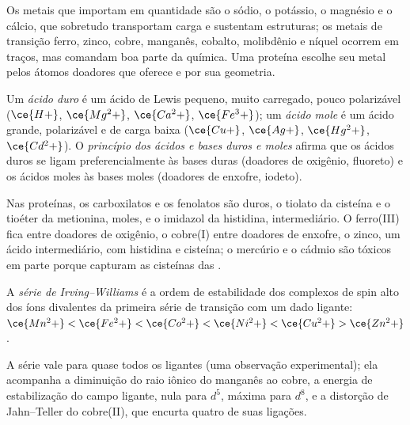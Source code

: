 Os metais que importam em quantidade são o sódio, o potássio, o magnésio e o
cálcio, que sobretudo transportam carga e sustentam estruturas; os metais de transição
ferro, zinco, cobre, manganês, cobalto, molibdênio e níquel ocorrem em traços,
mas comandam boa parte da química. Uma proteína escolhe seu metal pelos átomos
doadores que oferece e por sua geometria.

\begin{definition}\label{def:b3:bioinorganic:hsab}
Um \emph{ácido duro} é um ácido de Lewis pequeno, muito carregado, pouco
polarizável ($\ce{H+}$, $\ce{Mg^2+}$, $\ce{Ca^2+}$, $\ce{Fe^3+}$); um \emph{ácido
mole} é um ácido grande, polarizável e de carga baixa ($\ce{Cu+}$, $\ce{Ag+}$,
$\ce{Hg^2+}$, $\ce{Cd^2+}$). O \emph{princípio dos ácidos e bases duros e moles}
afirma que os ácidos duros se ligam preferencialmente às bases duras
(doadores de oxigênio, fluoreto) e os ácidos moles às bases moles (doadores de enxofre, iodeto).
\end{definition}

Nas proteínas, os carboxilatos e os fenolatos são duros, o tiolato da cisteína e
o tioéter da metionina, moles, e o imidazol da histidina, intermediário. O ferro(III)
fica entre doadores de oxigênio, o cobre(I) entre doadores de enxofre, o zinco, um ácido
intermediário, com histidina e cisteína; o mercúrio e o cádmio são tóxicos em parte
porque capturam as cisteínas das .

\begin{definition}\label{def:b3:bioinorganic:irving-williams}
A \emph{série de Irving--Williams} é a ordem
de estabilidade dos complexos de spin alto dos íons divalentes da primeira
série de transição com um dado ligante:
$\ce{Mn^2+} < \ce{Fe^2+} < \ce{Co^2+} < \ce{Ni^2+} < \ce{Cu^2+} > \ce{Zn^2+}$.
\end{definition}

\begin{proposition}\label{prop:b3:bioinorganic:irving-williams}
A série vale para quase todos os ligantes (uma observação experimental); ela
acompanha a diminuição do raio iônico do manganês ao cobre, a energia de estabilização
do campo ligante, nula para $d^5$, máxima para $d^8$, e a distorção de Jahn--Teller
do cobre(II), que encurta quatro de suas ligações.
\end{proposition}

